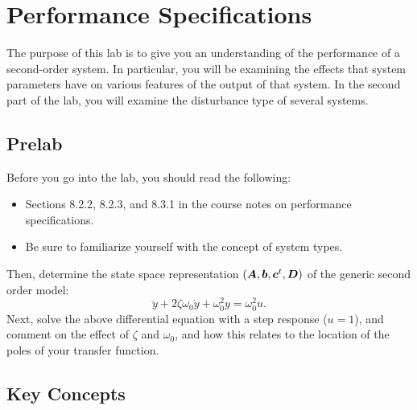 \chapter{Performance Specifications}

The purpose of this lab is to give you an understanding of the performance of
a second-order system.  In particular, you will be examining the effects that
system parameters have on various features of the output of that system.  In
the second part of the lab, you will examine the disturbance type of several
systems.

\section{Prelab}

Before you go into the lab, you should read the following:
\begin{itemize}
    \item Sections 8.2.2, 8.2.3, and 8.3.1 in the course notes on performance specifications.
    \item Be sure to familiarize yourself with the concept of system types.
\end{itemize}
Then, determine the state space representation
\((\boldsymbol{A},\boldsymbol{b},\boldsymbol{c}^{t},\boldsymbol{D}) \) of the generic second order model:
\begin{equation*}
    \ddot y +2\zeta\omega_{0}\dot y+\omega_{0}^{2}y=\omega_{0}^{2}u.
\end{equation*}
Next, solve the above differential equation with a step response (\(u = 1\)),
and comment on the effect of \(\zeta \) and \(\omega_0 \), and how this relates to
the location of the poles of your transfer function.

\section{Key Concepts}

